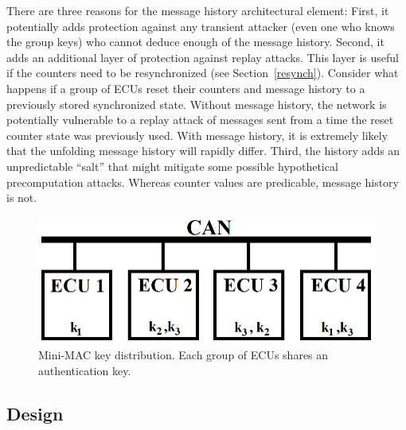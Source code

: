 There are three reasons for the message history architectural element:  
First, it potentially adds protection against any transient
attacker (even one who knows the group keys) who cannot deduce enough of the 
message history.  
Second, it adds an additional layer of protection against replay attacks.
This layer is useful if the counters need to be resynchronized (see Section~\ref{resynch}).
Consider what happens if a group of ECUs reset their counters and message history to
a previously stored synchronized state.  Without message history, the network
is potentially vulnerable to a replay attack of messages sent from a time 
the reset counter state was previously used.  With message history, it is extremely
likely that the unfolding message history will rapidly differ.
Third, the history adds an unpredictable ``salt'' that might mitigate some possible
hypothetical precomputation attacks.  Whereas counter values are predicable, message history
is not.

	\begin{figure}
		\centering
		\includegraphics[width=\columnwidth]{figures/key_distribution.png}
		\caption{Mini-MAC key distribution.  Each group of ECUs shares an authentication key.}
		\label{fig-key}
	\end{figure}
	
\subsection{Design}
\label{design}

